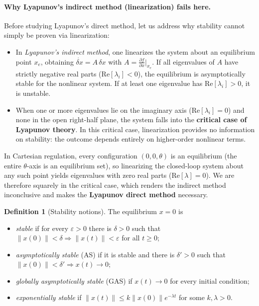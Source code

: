 \documentclass[11pt,a4paper]{article}
\def\bm#1{#1}%
\theoremstyle{definition}
\newtheorem{definition}{Definition}[section]
\theoremstyle{plain}
\theoremstyle{remark}
\begin{document}
\paragraph{Why Lyapunov's indirect method (linearization) fails here.}
Before studying Lyapunov's direct method, let us address why stability cannot simply be proven via linearization:
\begin{itemize}[leftmargin=*]
\item In \emph{Lyapunov's indirect method}, one linearizes the system about an equilibrium point $\bm x_e$, obtaining $\dot{\delta\bm x} = \bm A\,\delta\bm x$ with $\bm A = \frac{\partial\bm f}{\partial\bm x}\big|_{\bm x_e}$. If all eigenvalues of $\bm A$ have strictly negative real parts ($\mathrm{Re}[\lambda_i] < 0$), the equilibrium is asymptotically stable for the nonlinear system. If at least one eigenvalue has $\mathrm{Re}[\lambda_i] > 0$, it is unstable.
\item When one or more eigenvalues lie on the imaginary axis ($\mathrm{Re}[\lambda_i] = 0$) and none in the open right-half plane, the system falls into the \textbf{critical case of Lyapunov theory}. In this critical case, linearization provides no information on stability: the outcome depends entirely on higher-order nonlinear terms.
\end{itemize}
In Cartesian regulation, every configuration $(0,0,\theta)$ is an equilibrium (the entire $\theta$-axis is an equilibrium set), so linearizing the closed-loop system about any such point yields eigenvalues with zero real parts ($\mathrm{Re}[\lambda]=0$). We are therefore squarely in the critical case, which renders the indirect method inconclusive and makes the \textbf{Lyapunov direct method} necessary.

\begin{definition}[Stability notions]
The equilibrium $\bm x=\bm 0$ is
\begin{itemize}[leftmargin=*,nosep]
\item \emph{stable} if for every $\varepsilon>0$ there is $\delta>0$ such that $\|\bm x(0)\|<\delta\Rightarrow\|\bm x(t)\|<\varepsilon$ for all $t\ge0$;
\item \emph{asymptotically stable} (AS) if it is stable and there is $\delta'>0$ such that $\|\bm x(0)\|<\delta'\Rightarrow\bm x(t)\to\bm 0$;
\item \emph{globally asymptotically stable} (GAS) if $\bm x(t)\to\bm 0$ for every initial condition;
\item \emph{exponentially stable} if $\|\bm x(t)\|\le k\|\bm x(0)\|e^{-\lambda t}$ for some $k,\lambda>0$.
\end{itemize}
\end{definition}
\end{document}
